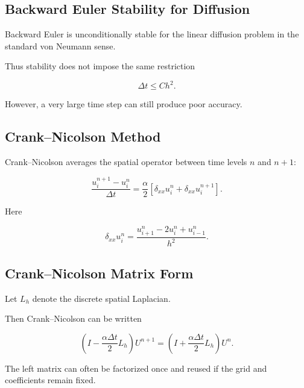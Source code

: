 \subsection{Backward Euler Stability for Diffusion}
\label{subsec:backward-euler-diffusion-stability}

Backward Euler is unconditionally stable for the linear diffusion problem
in the standard von Neumann sense.

Thus stability does not impose the same restriction

\[
\Delta t
\leq
C h^2.
\]

However, a very large time step can still produce poor accuracy.

\subsection{Crank--Nicolson Method}
\label{subsec:crank-nicolson}

Crank--Nicolson averages the spatial operator between time levels \(n\)
and \(n+1\):

\[
\boxed{
\frac{
u_i^{n+1}-u_i^n
}{
\Delta t
}
=
\frac{\alpha}{2}
\left[
\delta_{xx}u_i^n
+
\delta_{xx}u_i^{n+1}
\right].
}
\]

Here

\[
\boxed{
\delta_{xx}u_i^n
=
\frac{
u_{i+1}^n
-
2u_i^n
+
u_{i-1}^n
}{
h^2
}.
}
\]

\subsection{Crank--Nicolson Matrix Form}
\label{subsec:crank-nicolson-matrix}

Let \(L_h\) denote the discrete spatial Laplacian.

Then Crank--Nicolson can be written

\[
\boxed{
\left(
I
-
\frac{
\alpha\Delta t
}{
2
}
L_h
\right)
U^{n+1}
=
\left(
I
+
\frac{
\alpha\Delta t
}{
2
}
L_h
\right)
U^n.
}
\]

The left matrix can often be factorized once and reused if the grid and
coefficients remain fixed.

